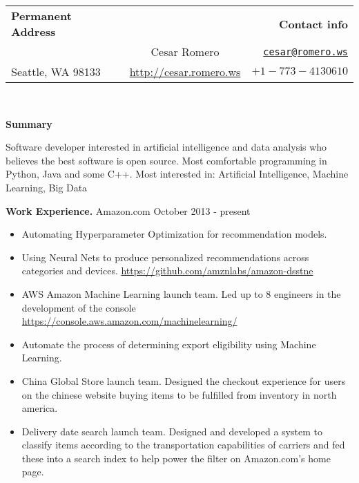 \documentclass[10pt]{article}
\newcommand{\vitem}{\vspace*{-.4pc}\item}
\begin{document}
\begin{tabular}{lcr}
  \textbf{Permanent Address}&&\textbf{Contact info}\\
  \href{}{}&\hspace*{2cm}\huge{Cesar Romero}\hspace*{2cm}&\href{mailto:cesar@romero.ws}{\texttt{cesar@romero.ws}}\\
Seattle, WA
98133&\href{http://cesar.romero.ws}{http://cesar.romero.ws}&$+1-773-4130610$\\
\end{tabular}\\
\underline{\makebox[\textwidth]{\hfill}}

\begin{center}
\textbf{Summary}
\end{center}

Software developer interested in artificial intelligence and data
analysis who believes the best software is open source. Most comfortable
programming in Python, Java and some C++. Most interested in:
Artificial Intelligence, Machine Learning, Big Data

\centering{}\textbf{Work Experience.}
 Amazon.com \hfill October 2013 - present
\begin{itemize}
  \vitem Automating Hyperparameter Optimization for recommendation models.

  \vitem Using Neural Nets to produce personalized recommendations
  across categories and
  devices. \href{https://github.com/amznlabs/amazon-dsstne}{https://github.com/amznlabs/amazon-dsstne}

  \vitem AWS Amazon Machine Learning launch team. Led up to 8
  engineers in the development of the console
  \href{https://console.aws.amazon.com/machinelearning/}{https://console.aws.amazon.com/machinelearning/}


\vitem Automate the process of determining export eligibility using Machine Learning.

  \vitem China Global Store launch team. Designed the checkout
  experience for users on the chinese website buying items to be
  fulfilled from inventory in north america.

  \vitem Delivery date search launch team. Designed and developed a
  system to classify items according to the transportation
  capabilities of carriers and fed these into a search index to help
  power the filter on Amazon.com's home page.
\end{itemize}
\end{document}
